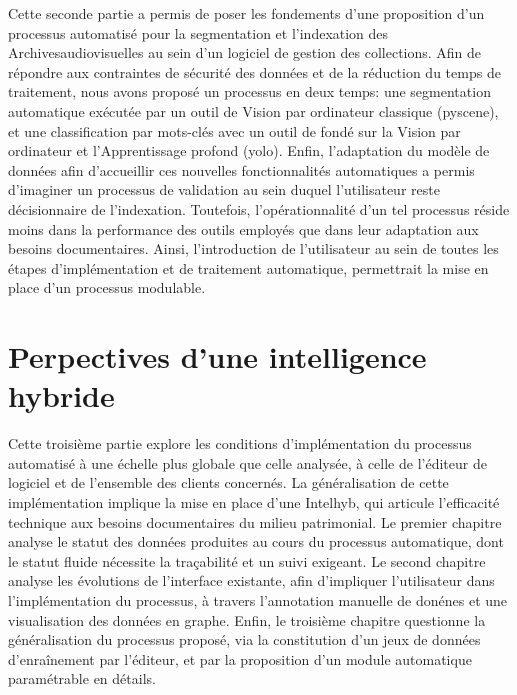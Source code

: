 \documentclass[12pt,twoside]{book}
\begin{document}


 



Cette seconde partie a permis de poser les fondements d'une proposition d'un processus automatisé pour la segmentation et l'indexation des \gls{Archivesaudiovisuelles} au sein d'un logiciel de gestion des collections. Afin de répondre aux contraintes de sécurité des données et de la réduction du temps de traitement, nous avons proposé un processus en deux temps: une segmentation automatique exécutée par un outil de \gls{Vision par ordinateur} classique (\gls{pyscene}), et une classification par mots-clés avec un outil de fondé sur la \gls{Vision par ordinateur} et l'\gls{Apprentissage profond} (\gls{yolo}). Enfin, l'adaptation du modèle de données afin d'accueillir ces nouvelles fonctionnalités automatiques a permis d'imaginer un processus de validation au sein duquel l'utilisateur reste décisionnaire de l'indexation. 
Toutefois, l'opérationnalité d'un tel processus réside moins dans la performance des outils employés que dans leur adaptation aux besoins documentaires. Ainsi, l'introduction de l'utilisateur au sein de toutes les étapes d'implémentation et de traitement automatique, permettrait la mise en place d'un processus modulable. 


\part{Perpectives d'une intelligence hybride}

Cette troisième partie explore les conditions d'implémentation du processus automatisé à une échelle plus globale que celle analysée, à celle de l'éditeur de logiciel et de l'ensemble des clients concernés. La généralisation de cette implémentation implique la mise en place d'une \gls{Intelhyb}, qui articule l'efficacité technique aux besoins documentaires du milieu patrimonial. 
Le premier chapitre analyse le statut des données produites au cours du processus automatique, dont le statut fluide nécessite la traçabilité et un suivi exigeant. Le second chapitre analyse les évolutions de l'interface existante, afin d'impliquer l'utilisateur dans l'implémentation du processus, à travers l'annotation manuelle de donénes et une visualisation des données en graphe. Enfin, le troisième chapitre questionne la généralisation du processus proposé, via la constitution d'un jeux de données d'enraînement par l'éditeur, et par la proposition d'un module automatique paramétrable en détails.
\end{document}
